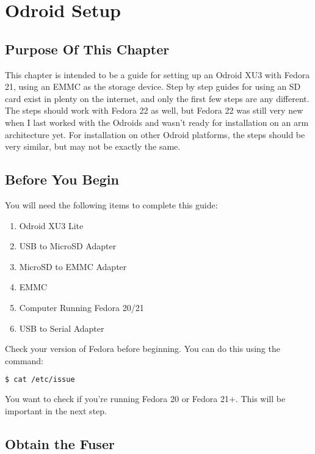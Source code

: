 
\chapter{Odroid Setup}
\label{chap:odroidsetup}

\section{Purpose Of This Chapter}

This chapter is intended to be a guide for setting up an Odroid XU3 with Fedora 21, using an EMMC as the storage device. Step by step guides for using an SD card exist in plenty on the internet, and only the first few steps are any different. The steps should work with Fedora 22 as well, but Fedora 22 was still very new when I last worked with the Odroids and wasn't ready for installation on an arm architecture yet. For installation on other Odroid platforms, the steps should be very similar, but may not be exactly the same.

\section{Before You Begin}

You will need the following items to complete this guide:
\begin{enumerate}
\item{Odroid XU3 Lite}
\item{USB to MicroSD Adapter}
\item{MicroSD to EMMC Adapter}
\item{EMMC}
\item{Computer Running Fedora 20/21}
\item{USB to Serial Adapter}
\end{enumerate}

Check your version of Fedora before beginning. You can do this using the command:
\begin{lstlisting}[language=bash]
  $ cat /etc/issue
\end{lstlisting}

You want to check if you're running Fedora 20 or Fedora 21+. This will be important in the next step.

\section{Obtain the Fuser}

